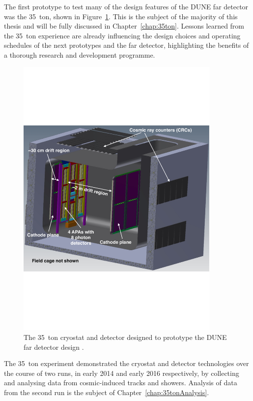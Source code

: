 The first prototype to test many of the design features of the DUNE far detector was the 35~ton, shown in Figure~\ref{fig:DUNE35ton}.  This is the subject of the majority of this thesis and will be fully discussed in Chapter~\ref{chap:35ton}.  Lessons learned from the 35~ton experience are already influencing the design choices and operating schedules of the next prototypes and the far detector, highlighting the benefits of a thorough research and development programme.

\begin{figure}
  \centering
  \includegraphics[width=10cm]{35ton.pdf}
  \caption[The 35~ton cryostat and detector designed to prototype the DUNE far detector design.]{The 35~ton cryostat and detector designed to prototype the DUNE far detector design \cite{35tonPhaseINeutrino2014}.}
  \label{fig:DUNE35ton}
\end{figure}

The 35~ton experiment demonstrated the cryostat and detector technologies over the course of two runs, in early 2014 and early 2016 respectively, by collecting and analysing data from cosmic-induced tracks and showers.  Analysis of data from the second run is the subject of Chapter~\ref{chap:35tonAnalysis}.

